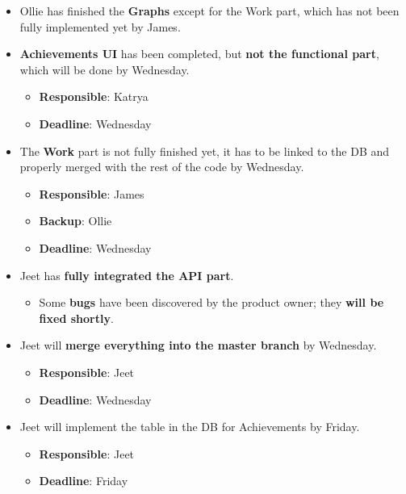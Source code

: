 \documentclass[12pt]{article}
\begin{document}
\begin{itemize}
\item
  Ollie has finished the \textbf{Graphs} except for the Work part, which
  has not been fully implemented yet by James.
\item
  \textbf{Achievements UI} has been completed, but \textbf{not the
  functional part}, which will be done by Wednesday.

  \begin{itemize}
  \tightlist
  \item
    \textbf{Responsible}: Katrya
  \item
    \textbf{Deadline}: Wednesday
  \end{itemize}
\item
  The \textbf{Work} part is not fully finished yet, it has to be linked
  to the DB and properly merged with the rest of the code by Wednesday.

  \begin{itemize}
  \tightlist
  \item
    \textbf{Responsible}: James
  \item
    \textbf{Backup}: Ollie
  \item
    \textbf{Deadline}: Wednesday
  \end{itemize}
\item
  Jeet has \textbf{fully integrated the API part}.

  \begin{itemize}
  \tightlist
  \item
    Some \textbf{bugs} have been discovered by the product owner; they
    \textbf{will be fixed shortly}.
  \end{itemize}
\item
  Jeet will \textbf{merge everything into the master branch} by
  Wednesday.

  \begin{itemize}
  \tightlist
  \item
    \textbf{Responsible}: Jeet
  \item
    \textbf{Deadline}: Wednesday
  \end{itemize}
\item
  Jeet will implement the table in the DB for Achievements by Friday.

  \begin{itemize}
  \tightlist
  \item
    \textbf{Responsible}: Jeet
  \item
    \textbf{Deadline}: Friday
  \end{itemize}
\end{itemize}
\end{document}
